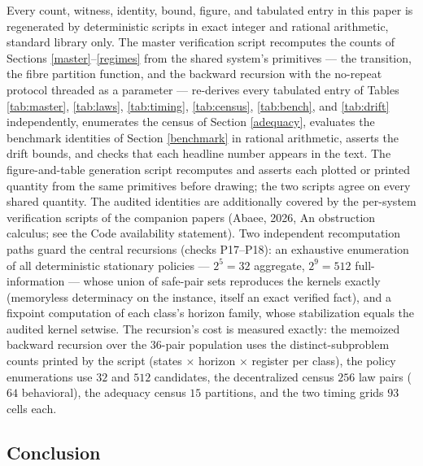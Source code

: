 \documentclass[10pt,twocolumn]{article}
\theoremstyle{definition}
\begin{document}
Every count, witness, identity, bound, figure, and tabulated entry in
this paper is regenerated by deterministic scripts in exact integer and
rational arithmetic, standard library only. The master verification
script recomputes the counts of Sections \ref{master}--\ref{regimes}
from the shared system's primitives --- the transition, the fibre
partition function, and the backward recursion with the no-repeat
protocol threaded as a parameter --- re-derives every tabulated entry of
Tables \ref{tab:master}, \ref{tab:laws}, \ref{tab:timing},
\ref{tab:census}, \ref{tab:bench}, and \ref{tab:drift} independently,
enumerates the census of Section \ref{adequacy}, evaluates the
benchmark identities of Section \ref{benchmark} in rational
arithmetic, asserts the drift bounds, and checks that each headline
number appears in the text. The figure-and-table generation script
recomputes and asserts each plotted or printed quantity from the same
primitives before drawing; the two scripts agree on every shared
quantity. The audited identities are additionally covered by the
per-system verification scripts of the companion papers (Abaee, 2026, An obstruction calculus;
see the Code availability statement). Two independent recomputation
paths guard the central recursions (checks P17--P18): an exhaustive
enumeration of all deterministic stationary policies --- \(2^{5} = 32\)
aggregate, \(2^{9} = 512\) full-information --- whose union of
safe-pair sets reproduces the kernels exactly (memoryless determinacy
on the instance, itself an exact verified fact), and a fixpoint
computation of each class's horizon family, whose stabilization equals
the audited kernel setwise. The recursion's cost is measured exactly:
the memoized backward recursion over the \(36\)-pair population uses
the distinct-subproblem counts printed by the script (states \(\times\)
horizon \(\times\) register per class), the policy enumerations use
\(32\) and \(512\) candidates, the decentralized census \(256\) law
pairs (\(64\) behavioral), the adequacy census \(15\) partitions, and
the two timing grids \(93\) cells each.

\subsection{Conclusion}\label{conclusion}
\end{document}
